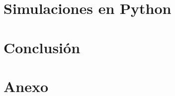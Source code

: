 \documentclass[11pt]{article}
\begin{document}
\section{Simulaciones en Python}


\section{Conclusión}


\section{Anexo}


\printbibliography

%
\end{document}
